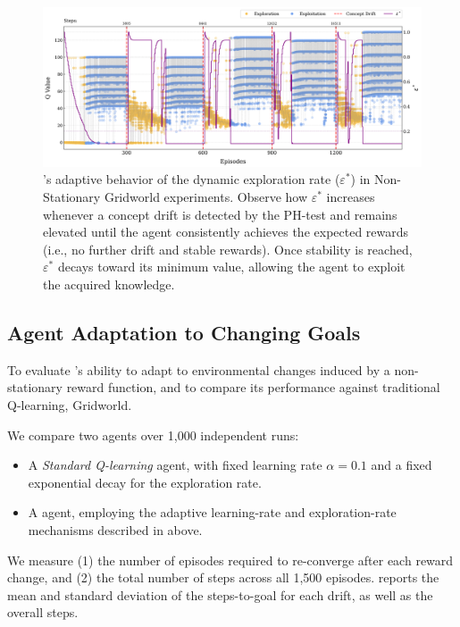 \begin{figure}
    \centering
    \includegraphics[width=\textwidth]{figures/eps}
    \caption{\adaptiverl's adaptive behavior of the dynamic exploration rate ($\varepsilon^*$) in Non-Stationary Gridworld experiments. Observe how $\varepsilon^*$ increases whenever a concept drift is detected by the PH-test and remains elevated until the agent consistently achieves the expected rewards (i.e., no further drift and stable rewards). Once stability is reached, $\varepsilon^*$ decays toward its minimum value, allowing the agent to exploit the acquired knowledge.}
    \label{fig:dynamic-eps}
\end{figure}

\subsection{Agent Adaptation to Changing Goals}
\label{sec:experiments}

To evaluate \adaptiverl's ability to adapt to environmental changes induced by a non-stationary reward function, and to compare its performance against traditional Q-learning, Gridworld. 

We compare two agents over 1,000 independent runs:  
\begin{itemize}
  \item A \emph{Standard Q-learning} agent, with fixed learning rate $\alpha=0.1$ and a fixed exponential decay for the exploration rate.
  \item A \emph{\adaptiverl} agent, employing the adaptive learning-rate and exploration-rate mechanisms described in above.
\end{itemize}
We measure (1) the number of episodes required to re-converge after each reward change, and (2) the total number of steps across all 1,500 episodes.  reports the mean and standard deviation of the steps-to-goal for each drift, as well as the overall steps.  

